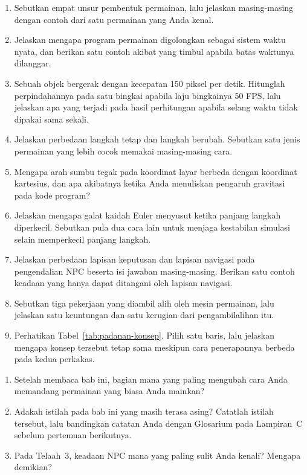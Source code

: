 
\begin{enumerate}
  \item Sebutkan empat unsur pembentuk permainan, lalu jelaskan masing-masing
        dengan contoh dari satu permainan yang Anda kenal.

  \item Jelaskan mengapa program permainan digolongkan sebagai sistem waktu
        nyata, dan berikan satu contoh akibat yang timbul apabila batas
        waktunya dilanggar.

  \item Sebuah objek bergerak dengan kecepatan 150 piksel per detik. Hitunglah
        perpindahannya pada satu bingkai apabila laju bingkainya 50 FPS, lalu
        jelaskan apa yang terjadi pada hasil perhitungan apabila selang waktu
        tidak dipakai sama sekali.

  \item Jelaskan perbedaan langkah tetap dan langkah berubah. Sebutkan satu
        jenis permainan yang lebih cocok memakai masing-masing cara.

  \item Mengapa arah sumbu tegak pada koordinat layar berbeda dengan koordinat
        kartesius, dan apa akibatnya ketika Anda menuliskan pengaruh gravitasi
        pada kode program?

  \item Jelaskan mengapa galat kaidah Euler menyusut ketika panjang langkah
        diperkecil. Sebutkan pula dua cara lain untuk menjaga kestabilan
        simulasi selain memperkecil panjang langkah.

  \item Jelaskan perbedaan lapisan keputusan dan lapisan navigasi pada
        pengendalian NPC beserta isi jawaban masing-masing. Berikan satu contoh
        keadaan yang hanya dapat ditangani oleh lapisan navigasi.

  \item Sebutkan tiga pekerjaan yang diambil alih oleh mesin permainan, lalu
        jelaskan satu keuntungan dan satu kerugian dari pengambilalihan itu.

  \item Perhatikan Tabel~\ref{tab:padanan-konsep}. Pilih satu baris, lalu
        jelaskan mengapa konsep tersebut tetap sama meskipun cara
        penerapannya berbeda pada kedua perkakas.
\end{enumerate}

\begin{refleksibox}
\begin{enumerate}
  \item Setelah membaca bab ini, bagian mana yang paling mengubah cara Anda
        memandang permainan yang biasa Anda mainkan?
  \item Adakah istilah pada bab ini yang masih terasa asing? Catatlah istilah
        tersebut, lalu bandingkan catatan Anda dengan Glosarium pada
        Lampiran~C sebelum pertemuan berikutnya.
  \item Pada Telaah~3, keadaan NPC mana yang paling sulit Anda kenali?
        Mengapa demikian?
\end{enumerate}
\end{refleksibox}
